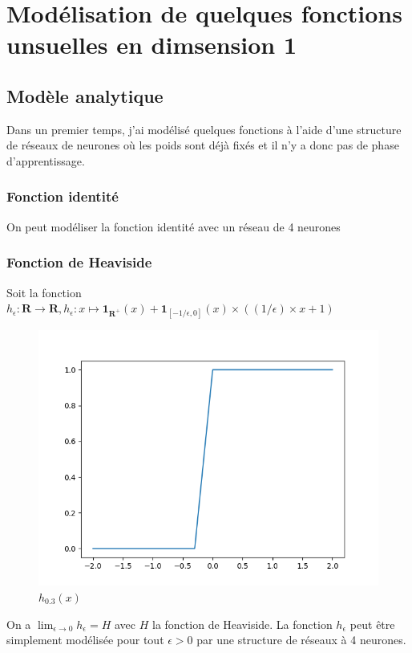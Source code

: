 \documentclass[a4paper,11pt,twoside]{report}
\begin{document}
	\chapter{Modélisation de quelques fonctions unsuelles en dimsension 1}
	\section{Modèle analytique}
	Dans un premier temps, j'ai modélisé quelques fonctions à l'aide d'une structure de réseaux de neurones où les poids sont déjà fixés et il n'y a donc pas de phase d'apprentissage. %
	\subsection{Fonction identité}
	On peut modéliser la fonction identité avec un réseau de 4 neurones
	\subsection{Fonction de Heaviside}
	Soit la fonction $h_\epsilon:\textbf{R}\rightarrow\textbf{R}, h_\epsilon:x\mapsto\mathbf{1}_{\textbf{R}^{+}}(x)+\mathbf{1}_{[-1/\epsilon,0]}(x)\times ((1/\epsilon)\times x+1)$ 
	\begin{figure}[H]
		\begin{center}
			\includegraphics[width=0.7\linewidth]{approx_h.png}
			\caption{$h_{0.3}(x)$}
		\end{center}
	\end{figure}
	
	On a  $\lim_{\epsilon\to0}h_\epsilon = H$ avec $H$ la fonction de Heaviside.
	La fonction $h_\epsilon$ peut être simplement modélisée pour tout $\epsilon>0$ par une structure de réseaux à 4 neurones.
\end{document}

